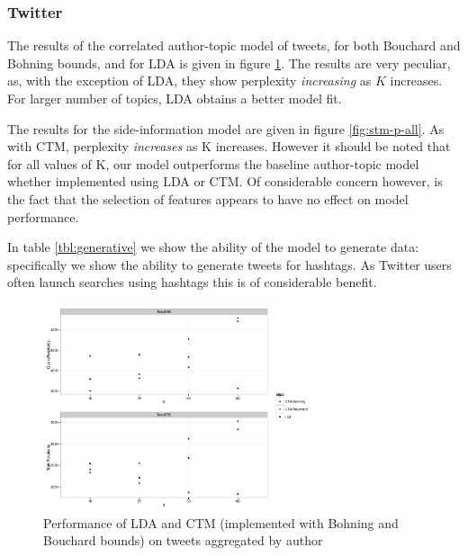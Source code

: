\subsubsection*{Twitter}
The results of the correlated author-topic model of tweets, for both Bouchard and Bohning bounds, and for LDA is given in figure \ref{fig:tweet-ctm-lda}. The results are very peculiar, as, with the exception of LDA, they show perplexity \emph{increasing} as $K$ increases. For larger number of topics, LDA obtains a better model fit.


The results for the side-information model are given in figure \ref{fig:stm-p-all}. As with CTM, perplexity \emph{increases} as K increases. However it should be noted that for all values of K, our model outperforms the baseline author-topic model whether implemented using LDA or CTM. Of considerable concern however, is the fact that the selection of features appears to have no effect on model performance.

In table \ref{tbl:generative} we show the ability of the model to generate data: specifically we show the ability to generate tweets for hashtags. As Twitter users often launch searches using hashtags this is of considerable benefit.


\begin{figure}
\centering
    \includegraphics[width=0.7\textwidth]{plots/TweetCtmLda.pdf}
    \caption{Performance of LDA and CTM (implemented with Bohning and Bouchard bounds) on tweets aggregated by author}
    \label{fig:tweet-ctm-lda}
\end{figure}

